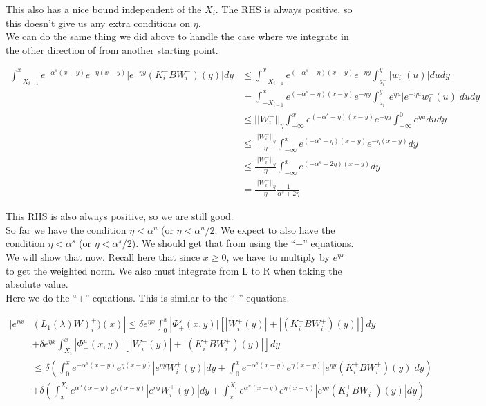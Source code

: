 \documentclass[12pt]{article}
\begin{document}
This also has a nice bound independent of the $X_i$. The RHS is always positive, so this doesn't give us any extra conditions on $\eta$.\\

We can do the same thing we did above to handle the case where we integrate in the other direction of from another starting point.

\begin{align*}
\int_{-X_{i-1}}^x e^{-\alpha^s (x-y)}e^{-\eta(x-y)}|e^{-\eta y} (K_i^- B W_i^-)(y)| dy &\leq \int_{-X_{i-1}}^x e^{(-\alpha^s - \eta)(x-y)}e^{-\eta y} \int_{a_i^-}^y |w_i^-(u)| du dy \\
&= \int_{-X_{i-1}}^x e^{(-\alpha^s - \eta)(x-y)}e^{-\eta y} \int_{a_i^-}^y e^{\eta u} |e^{-\eta u} w_i^-(u)| du dy \\
&\leq ||W_i^-||_\eta \int_{-\infty}^x e^{(-\alpha^s - \eta)(x-y)}e^{-\eta y} \int_{-\infty}^0 e^{\eta u} du dy \\
&\leq \frac{||W_i^-||_\eta}{\eta} \int_{-\infty}^x e^{(-\alpha^s - \eta)(x-y)}e^{-\eta(x-y)} dy \\
&\leq \frac{||W_i^-||_\eta}{\eta} \int_{-\infty}^x e^{(-\alpha^s - 2\eta)(x-y)} dy \\
&= \frac{||W_i^-||_\eta}{\eta} \frac{1}{\alpha^s + 2\eta}
\end{align*}

This RHS is also always positive, so we are still good.\\

So far we have the condition $\eta < \alpha^u$ (or $\eta < \alpha^u / 2$. We expect to also have the condition $\eta < \alpha^s$ (or $\eta < \alpha^s/2$). We should get that from using the ``+'' equations. We will show that now. Recall here that since $x \geq 0$, we have to multiply by $e^{\eta x}$ to get the weighted norm. We also must integrate from L to R when taking the absolute value.\\

Here we do the ``+'' equations. This is similar to the ``-'' equations.

\begin{align*}
|e^{\eta x} & (L_1(\lambda)W)_i^+)(x) | \leq \delta e^{\eta x} \int_0^x |\Phi^s_+(x, y)|[|W_i^+(y)| + |(K_i^+ B W_i^+)(y)| ] dy \\
&+ \delta e^{\eta x} \int_{X_i}^x |\Phi^u_+(x, y)|[|W_i^+(y)| + |(K_i^+ B W_i^+)(y)| ] dy \\
&\leq \delta \left( \int_0^x e^{-\alpha^s (x-y)}e^{\eta(x-y)}|e^{\eta y} W_i^+(y)| dy 
+ \int_0^x e^{-\alpha^s (x-y)}e^{\eta(x-y)}|e^{\eta y} (K_i^+ B W_i^+)(y)| dy  \right) \\
&+ \delta \left( \int_x^{X_i} e^{\alpha^u (x-y)}e^{\eta(x-y)}|e^{\eta y} W_i^+(y)| dy 
+ \int_x^{X_i} e^{\alpha^u (x-y)}e^{\eta(x-y)}|e^{\eta y} (K_i^+ B W_i^+)(y)| dy  \right) \\ 
\end{align*}
\end{document}

